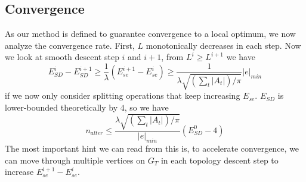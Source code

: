 \subsection{Convergence}
\label{sec:convergence}

As our method is defined to guarantee convergence to a local optimum, we now analyze the convergence rate. First, $L$ monotonically decreases in each step. Now we look at smooth descent step $i$ and $i+1$, from $L^i \geq L^{i+1}$ we have
\[ E^i_{SD} - E^{i+1}_{SD} \geq \frac{1}{\lambda} (E^{i+1}_{se} - E^i_{se}) \geq \frac{1}{\lambda\sqrt{(\sum_t |A_t|)/\pi}} |e|_{min} \]
if we now only consider splitting operations that keep increasing $E_{se}$. $E_{SD}$ is lower-bounded theoretically by $4$, so we have
\[ n_{alter} \leq \frac{\lambda\sqrt{(\sum_t |A_t|)/\pi}}{|e|_{min}} (E^0_{SD} - 4) \]
The most important hint we can read from this is, to accelerate convergence, we can move through multiple vertices on $G_T$ in each topology descent step to increase $E^{i+1}_{se} - E^i_{se}$.

 